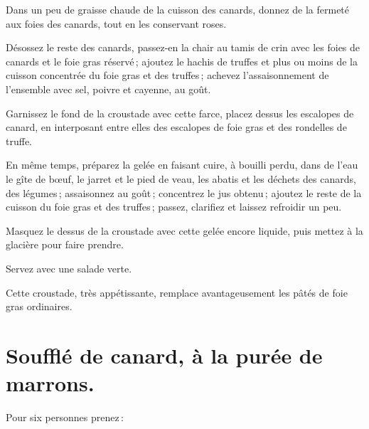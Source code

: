 Dans un peu de graisse chaude de la cuisson des canards, donnez de la fermeté
aux foies des canards, tout en les conservant roses.

Désossez le reste des canards, passez-en la chair au tamis de crin avec les
foies de canards et le foie gras réservé ; ajoutez le hachis de truffes et plus
ou moins de la cuisson concentrée du foie gras et des truffes ; achevez
l'assaisonnement de l'ensemble avec sel, poivre et cayenne, au goût.

Garnissez le fond de la croustade avec cette farce, placez dessus les escalopes
de canard, en interposant entre elles des escalopes de foie gras et des
rondelles de truffe.

En même temps, préparez la gelée en faisant cuire, à bouilli perdu, dans de
l’eau le gîte de bœuf, le jarret et le pied de veau, les abatis et les déchets
des canards, des légumes ; assaisonnez au goût ; concentrez le jus obtenu ;
ajoutez le reste de la cuisson du foie gras et des truffes ; passez, clarifiez
et laissez refroidir un peu.

Masquez le dessus de la croustade avec cette gelée encore liquide, puis mettez
à la glacière pour faire prendre.

Servez avec une salade verte.

Cette croustade, très appétissante, remplace avantageusement les pâtés de foie
gras ordinaires.

\section*{\centering Soufflé de canard, à la purée de marrons.}
{}

Pour six personnes prenez :

\medskip

